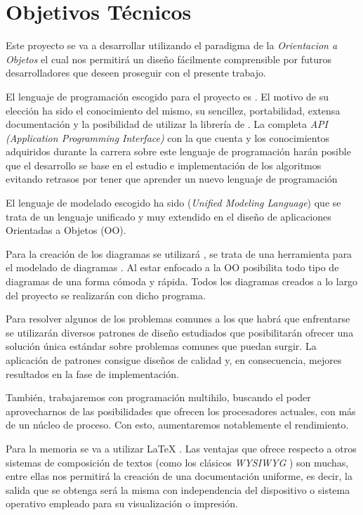 \section{Objetivos Técnicos}
Este proyecto se va a desarrollar utilizando el paradigma de la \textit{Orientacion a Objetos} el cual nos permitirá un diseño fácilmente comprensible por futuros desarrolladores que deseen proseguir con el presente trabajo. 

El lenguaje de programación escogido para el proyecto es \javaversion{}. El motivo de su elección ha sido el conocimiento del mismo, su sencillez, portabilidad, extensa documentación y la posibilidad de utilizar la librería de \weka{}. La completa \textit{API (Application Programming Interface)} con la que cuenta y los conocimientos adquiridos durante la carrera sobre este lenguaje de programación harán posible que el desarrollo se base en el estudio e implementación de los algoritmos evitando retrasos por tener que aprender un nuevo lenguaje de programación

El lenguaje de modelado escogido ha sido \uml{} (\textit{Unified Modeling Language}) que se trata de un lenguaje unificado y muy extendido en el diseño de aplicaciones Orientadas a Objetos (OO).

Para la creación de los diagramas se utilizará \jude{}, se trata de una herramienta para el modelado de diagramas \uml{}. Al estar enfocado a la OO posibilita todo tipo de diagramas de una forma cómoda y rápida. Todos los diagramas creados a lo largo del proyecto se realizarán con dicho programa.

Para resolver algunos de los problemas comunes a los que habrá que enfrentarse se utilizarán diversos patrones de diseño \cite{patrones} estudiados que posibilitarán ofrecer una solución única estándar sobre problemas comunes que puedan surgir. La aplicación de patrones consigue diseños de calidad y, en consecuencia, mejores resultados en la fase de implementación.

También, trabajaremos con programación multihilo, buscando el poder aprovecharnos de las posibilidades que ofrecen los procesadores actuales, con más de un núcleo de proceso. Con esto, aumentaremos notablemente el rendimiento.

Para la memoria se va a utilizar \LaTeX{} . Las ventajas que ofrece respecto a otros sistemas de composición de textos (como los clásicos \textit{WYSIWYG} ) son muchas, entre ellas nos permitirá la creación de una documentación uniforme, es decir, la salida que se obtenga será la misma con independencia del dispositivo o sistema operativo empleado para su visualización o impresión.

